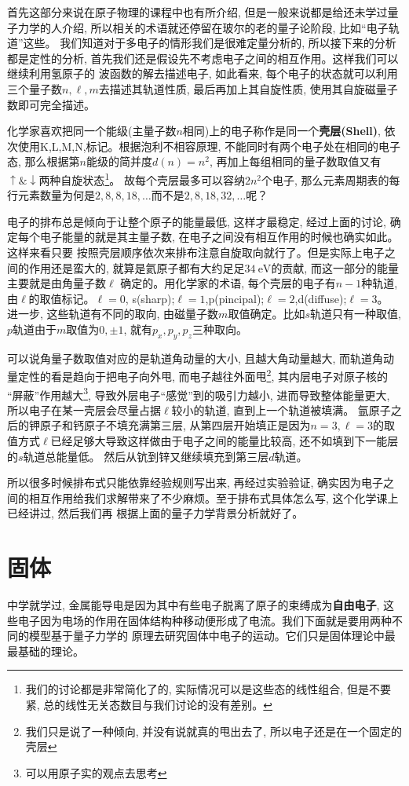 首先这部分来说在原子物理的课程中也有所介绍, 但是一般来说都是给还未学过量子力学的人介绍, 所以相关的术语就还停留在玻尔的老的量子论阶段, 比如“电子轨道”这些。
我们知道对于多电子的情形我们是很难定量分析的, 所以接下来的分析都是定性的分析, 首先我们还是假设先不考虑电子之间的相互作用。这样我们可以继续利用氢原子的
波函数的解去描述电子, 如此看来, 每个电子的状态就可以利用三个量子数$n,\ell,m$去描述其轨道性质, 最后再加上其自旋性质, 使用其自旋磁量子数即可完全描述。

化学家喜欢把同一个能级(主量子数$n$相同)上的电子称作是同一个\textbf{壳层(Shell)}, 依次使用K,L,M,N,标记。根据泡利不相容原理, 不能同时有两个电子处在相同的电子态, 
那么根据第$n$能级的简并度$d(n)=n^2$, 再加上每组相同的量子数取值又有$\uparrow\&\downarrow$两种自旋状态\footnote{我们的讨论都是非常简化了的, 实际情况可以是这些态的线性组合, 但是不要紧, 总的线性无关态数目与我们讨论的没有差别。}。
故每个壳层最多可以容纳$2n^2$个电子, 那么元素周期表的每行元素数量为何是$2,8,8,18,\ldots$而不是$2,8,18,32,\ldots$呢？

电子的排布总是倾向于让整个原子的能量最低, 这样才最稳定, 经过上面的讨论, 确定每个电子能量的就是其主量子数, 在电子之间没有相互作用的时候也确实如此。这样来看只要
按照壳层顺序依次来排布注意自旋取向就行了。但是实际上电子之间的作用还是蛮大的, 就算是氦原子都有大约足足$\SI{34}{\eV}$的贡献, 而这一部分的能量主要就是由角量子数$\ell$
确定的。用化学家的术语, 每个壳层的电子有$n-1$种轨道, 由$\ell$的取值标记。$\ell=0$, s(sharp);$\ell=1$,p(pincipal);$\ell=2$,d(diffuse);$\ell=3$。
进一步, 这些轨道有不同的取向, 由磁量子数$m$取值确定。比如$s$轨道只有一种取值, $p$轨道由于$m$取值为$0,\pm 1$, 就有$p_x,p_y,p_z$三种取向。

可以说角量子数取值对应的是轨道角动量的大小, 且越大角动量越大, 而轨道角动量定性的看是趋向于把电子向外甩, 而电子越往外面甩\footnote{我们只是说了一种倾向, 并没有说就真的甩出去了, 所以电子还是在一个固定的壳层}, 其内层电子对原子核的
“屏蔽”作用越大\footnote{可以用原子实的观点去思考}, 导致外层电子“感觉”到的吸引力越小, 进而导致整体能量更大, 所以电子在某一壳层会尽量占据$\ell$较小的轨道, 直到上一个轨道被填满。
氩原子之后的钾原子和钙原子不填充满第三层, 从第四层开始填正是因为$n=3,\ell=3$的取值方式$\ell$已经足够大导致这样做由于电子之间的能量比较高, 还不如填到下一能层的$s$轨道总能量低。
然后从钪到锌又继续填充到第三层$d$轨道。

所以很多时候排布式只能依靠经验规则写出来, 再经过实验验证, 确实因为电子之间的相互作用给我们求解带来了不少麻烦。至于排布式具体怎么写, 这个化学课上已经讲过, 然后我们再
根据上面的量子力学背景分析就好了。
\section{固体}
中学就学过, 金属能导电是因为其中有些电子脱离了原子的束缚成为\textbf{自由电子}, 这些电子因为电场的作用在固体结构种移动便形成了电流。我们下面就是要用两种不同的模型基于量子力学的
原理去研究固体中电子的运动。它们只是固体理论中最最基础的理论。

